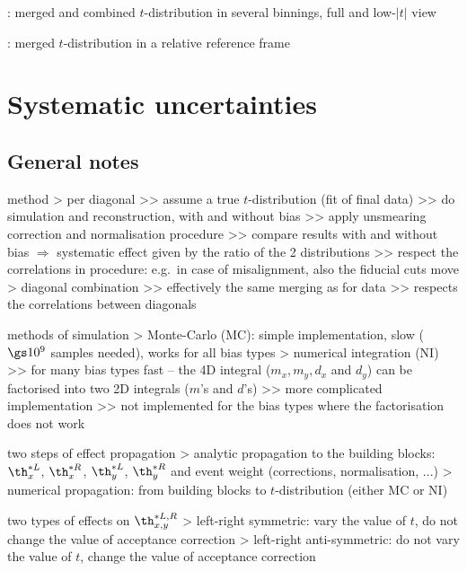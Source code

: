 \>  : merged and combined $t$-distribution in several binnings, full and low-$|t|$ view

\>  : merged $t$-distribution in a relative reference frame

\fi



\chapter[systematics]{Systematic uncertainties}

\iffalse

\section[systematics-general]{General notes}

\> method
\>> per diagonal
\>>> assume a true $t$-distribution (fit of final data)
\>>> do simulation and reconstruction, with and without bias
\>>> apply unsmearing correction and normalisation procedure
\>>> compare results with and without bias $\Rightarrow$ systematic effect given by the ratio of the 2 distributions
\>>> respect the correlations in procedure: e.g.~in case of misalignment, also the fiducial cuts move
\>> diagonal combination
\>>> effectively the same merging as for data
\>>> respects the correlations between diagonals

 methods of simulation
\>> Monte-Carlo (MC): simple implementation, slow ($\gs 10^9$ samples needed), works for all bias types
\>> numerical integration (NI)
\>>> for many bias types fast -- the 4D integral ($m_x, m_y, d_x$ and $d_y$) can be factorised into two 2D integrals ($m$'s and $d$'s)
\>>> more complicated implementation
\>>> not implemented for the bias types where the factorisation does not work

\> two steps of effect propagation
\>> analytic propagation to the building blocks: $\th^{*L}_x$, $\th^{*R}_x$, $\th^{*L}_y$, $\th^{*R}_y$ and event weight (corrections, normalisation, ...)
\>> numerical propagation: from building blocks to $t$-distribution (either MC or NI)

\> two types of effects on $\th^{*L,R}_{x, y}$
\>> left-right symmetric: vary the value of $t$, do not change the value of acceptance correction
\>> left-right anti-symmetric: do not vary the value of $t$, change the value of acceptance correction


